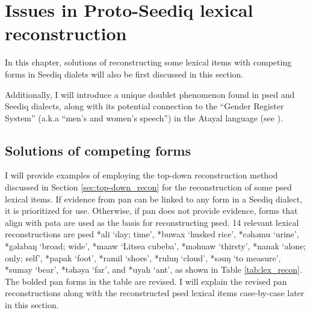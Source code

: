 \chapter{Issues in Proto-Seediq lexical reconstruction} \label{ch6}

In this chapter, solutions of reconstructing some lexical items with competing forms in Seediq dialets will also be first discussed in this section.

Additionally, I will introduce a unique doublet phenomenon found in \acl{psed} and Seediq dialects, along with its potential connection to the ``Gender Register System'' (a.k.a ``men's and women's speech'') in the Atayal language (see \cite{li1980gender,li1982gender,li1983gender,goderich2020phd}). 


\section{Solutions of competing forms} \label{sec:external_lexical_evidence}

I will provide examples of employing the top-down reconstruction method discussed in Section \ref{sec:top-down_recon} for the reconstruction of some \acl{psed} lexical items. If evidence from \acl{pan} can be linked to any form in a Seediq dialect, it is prioritized for use. Otherwise, if \acl{pan} does not provide evidence, forms that align with \acl{pata} are used as the basis for reconstructing \acl{psed}. 14 relevant lexical reconstructions are \acl{psed} *ali `day; time', *buwax `husked rice', *cəhəmu `urine', *gəlabaŋ `broad; wide', *maaw `Litsea cubeba', *məhuaw `thirsty', *nanak `alone; only; self', *papak `foot', *ramil `shoes', *ruluŋ `cloud', *səuŋ `to measure', *sumay `bear', *təhəya `far', and *uyah `ant', as shown in Table \ref{tab:lex_recon}. The bolded \acs{pan} forms in the table are revised. I will explain the revised \acs{pan} reconstructions along with the reconstructed \acl{psed} lexical items case-by-case later in this section.

